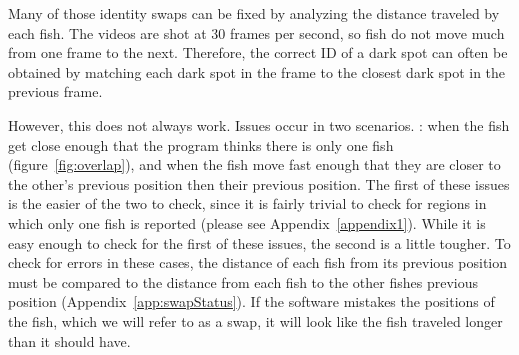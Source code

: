\documentclass{article}
\newlength{\mylen}
\begin{document}
Many of those identity swaps can be fixed by analyzing the distance traveled by each fish. The videos are shot at 30 frames per second, so fish do not move much from one frame to the next. Therefore, the correct ID of a dark spot can often be obtained by matching each dark spot in the frame to the closest dark spot in the previous frame.


However, this does not always work. Issues occur in two scenarios. : when the fish get close enough that the program thinks there is only one fish (figure~\ref{fig:overlap}), and when the fish move fast enough that they are closer to the other's previous position then their previous position. The first of these issues is the easier of the two to check, since it is fairly trivial to check for regions in which only one fish is reported (please see Appendix~\ref{appendix1}). While it is easy enough to check for the first of these issues, the second is a little tougher. To check for errors in these cases, the distance of each fish from its previous position must be compared to the distance from each fish to the other fishes previous position (Appendix~\ref{app:swapStatus}). If the software mistakes the positions of the fish, which we will refer to as a swap, it will look like the fish traveled longer than it should have.
\end{document}
